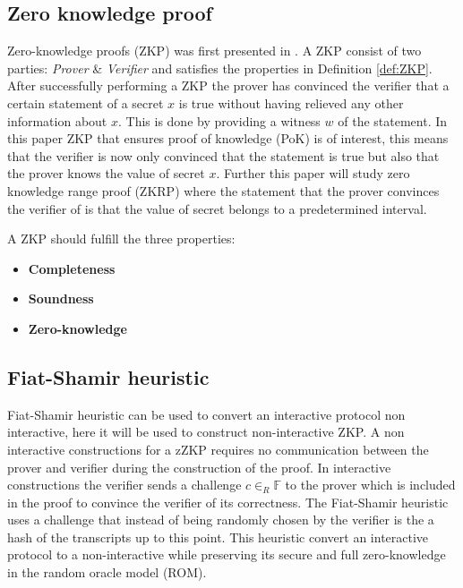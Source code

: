 \subsection*{Zero knowledge proof}
Zero-knowledge proofs  (ZKP) was first presented in \cite{OG_ZKP}. A ZKP consist of two parties: \textit{Prover} \& \textit{Verifier} and satisfies the properties  in Definition \ref{def:ZKP}. After successfully performing a ZKP the prover has convinced the verifier that a certain statement of a secret $x$ is true without having relieved any other information about $x$. This is done by providing a witness $w$ of the statement. In this paper ZKP that ensures proof of knowledge (PoK) is of interest,  this means that the verifier is now only convinced that the statement is true but also that the prover knows the value of secret $x$.  Further this paper will study zero knowledge range proof (ZKRP) where the statement that the prover convinces the verifier of is that the value of secret belongs to a predetermined interval.

\begin{Mydef}
\label{def:ZKP}
A ZKP should fulfill the three properties: 
\begin{itemize}
\item \textbf{Completeness} 
\item \textbf{Soundness} 
\item  \textbf{Zero-knowledge}
\end{itemize}
\end{Mydef}

\subsection*{Fiat-Shamir heuristic}
 Fiat-Shamir heuristic \cite{Fiat-Shamir} can be used to convert an interactive protocol  non interactive, here it will be used to construct non-interactive ZKP. A non interactive constructions for a zZKP requires no communication between the prover and verifier during the construction of the proof. In interactive constructions the verifier sends a challenge $c\in_R\mathds{F}$ to the prover which is included in the proof to convince the verifier of its correctness. The Fiat-Shamir heuristic uses a challenge that instead of being randomly chosen by the verifier is the a hash of the transcripts up to this point. This heuristic convert an interactive protocol to a non-interactive while preserving its secure and full zero-knowledge in the random oracle model (ROM). 


